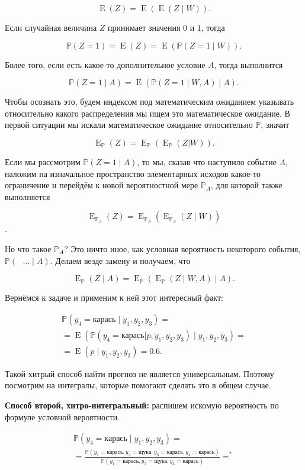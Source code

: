 \documentclass[12pt, a4paper, oneside]{extreport}
\DeclareMathOperator{\E}{\mathop{E}}
\def \mbb{\mathbb}
\def \PP{\mbb{P}}
\theoremstyle{plain}              %
\theoremstyle{definition}         %
\begin{document}
\[ \E(Z) = \E( \E(Z \mid W)). \] 

 Если случайная величина $Z$ принимает значения $0$ и $1$, тогда

\[  \PP(Z = 1) = \E(Z) = \E( \PP( Z = 1 \mid W)). \]

Более того, если есть какое-то дополнительное условие $A$, тогда выполнится 

 \[ \PP(Z=1 \mid A) = \E(\PP(Z = 1 \mid W,A) \mid A).\]

Чтобы осознать это, будем индексом под математическим ожиданием указывать относительно какого распределения мы ищем это математическое ожидание. В первой ситуации мы искали математическое ожидание относительно $\PP$, значит

 \[ \E_{\PP}(Z) = \E_{\PP}(\E_{\PP}(Z|W)).\]

Если мы рассмотрим $\PP(Z=1 \mid A)$, то мы, сказав что наступило событие $A$, наложим на изначальное пространство элементарных исходов какое-то ограничение и перейдём к новой вероятностной мере $\PP_A$, для которой также выполняется

\[ \E_{\PP_A}(Z) = \E_{\PP_A}(\E_{\PP_A}(Z \mid W)) \].

Но что такое $\PP_A$? Это ничто иное, как условная вероятность некоторого события, $\PP(\mbox{ } \ldots \mid A)$. Делаем везде замену и получаем, что

\[\E_{\PP}(Z \mid A) = \E_{\PP}(\E_{\PP}(Z \mid W, A)\mid A).\]

Вернёмся к задаче и применим к ней этот интересный факт:

\begin{multline*}
 \PP(y_4 = \text{карась} \mid y_1,y_2,y_3) = \\ =  \E( \PP( y_4 = \text{карась} | p,y_1,y_2,y_3) \mid y_1,y_2,y_3) = \\ =  \E(p \mid y_1,y_2,y_3) = 0.6.
\end{multline*}

Такой хитрый способ найти прогноз не является универсальным. Поэтому посмотрим на интегралы, которые помогают сделать это в общем случае. 

\textbf{Способ второй, хитро-интегральный:} распишем искомую вероятность по формуле условной вероятности. 

\begin{multline*}
\PP(y_4 = \text{карась} \mid y_1,y_2,y_3) = \\ =  \frac{\PP(y_1 = \text{карась},y_2 = \text{щука},y_3 = \text{карась},y_4 = \text{карась})}{\PP(y_1 = \text{карась},y_2 = \text{щука},y_3 = \text{карась})} = ^*
\end{multline*}
\end{document}
